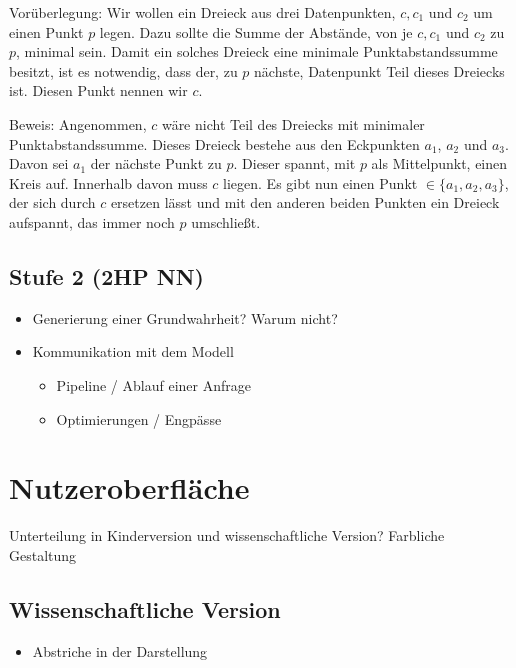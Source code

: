 \documentclass[a4paper]{extarticle}
\begin{document}
    Vorüberlegung:
    Wir wollen ein Dreieck aus drei Datenpunkten, $c, c_1$ und $c_2$ um einen Punkt $p$ legen.
    Dazu sollte die Summe der Abstände, von je $c, c_1$ und $c_2$ zu $p$, minimal sein.
    Damit ein solches Dreieck eine minimale Punktabstandssumme besitzt,
    ist es notwendig, dass der, zu $p$ nächste, Datenpunkt Teil dieses Dreiecks ist. Diesen Punkt 
    nennen wir $c$.

    Beweis:
    Angenommen, $c$ wäre nicht Teil des Dreiecks mit minimaler Punktabstandssumme.
    Dieses Dreieck bestehe aus den Eckpunkten $a_1$, $a_2$ und $a_3$. Davon sei $a_1$ der 
    nächste Punkt zu $p$. Dieser spannt, mit $p$ als Mittelpunkt, einen Kreis auf. 
    Innerhalb davon muss $c$ liegen.
    Es gibt nun einen Punkt $\in \{ a_1, a_2, a_3 \}$, der sich durch $c$ ersetzen lässt und
    mit den anderen beiden Punkten ein Dreieck aufspannt, das immer noch $p$ umschließt.
    
         
    
    
    \subsection{Stufe 2 (2HP NN)}
    \begin{itemize}
        \item Generierung einer Grundwahrheit? Warum nicht?
        \item Kommunikation mit dem Modell
        \begin{itemize}
            \item Pipeline / Ablauf einer Anfrage
            \item Optimierungen / Engpässe
        \end{itemize}
    \end{itemize}

    \section{Nutzeroberfläche}

    Unterteilung in Kinderversion und wissenschaftliche Version?
    Farbliche Gestaltung
    
    \subsection{Wissenschaftliche Version}
    \begin{itemize}
        \item Abstriche in der Darstellung
    \end{itemize}
\end{document}
